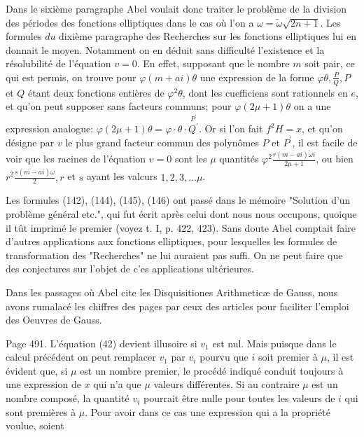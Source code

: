 \documentclass{article}
\begin{document}
Dans le sixième paragraphe Abel voulait donc traiter le problème de la division des périodes des fonctions elliptiques dans le cas où l'on a \(\omega=\tilde{\omega} \sqrt{2 n+1}\). Les formules \(d u\) dixième paragraphe des Recherches sur les fonctions elliptiques lui en donnait le moyen. Notamment on en déduit sans difficulté l'existence et la résolubilité de l'équation \(v=0\). En effet, supposant que le nombre \(m\) soit pair, ce qui est permis, on trouve pour \(\varphi(m+a i) \theta\) une expression de la forme \(\varphi \theta, \frac{P}{Q}, P\) et \(Q\) étant deux fonctions entières de \(\varphi^{2} \theta\), dont les cuefficiens sont rationnels en \(e\), et qu'on peut supposer sans facteurs communs; pour \(\varphi(2 \mu+1) \theta\) on a une expression analogue: \(\varphi(2 \mu+1) \theta=\varphi \cdot \theta \cdot \stackrel{P^{\prime}}{Q^{\prime}}\). Or si l'on fait \(f^{2} H=x\), et qu'on désigne par \(v\) le plus grand facteur commun des polynômes \(P\) et \(P^{\prime}\), il est facile de voir que les racines de l'équation \(v=0\) sont les \(\mu\) quantités \(\varphi^{2} \frac{r(m-a i) \tilde{\omega} i}{2 \mu+1}\), ou bien \(r^{2} \frac{s(m-a i) \omega}{2}, r\) et \(s\) ayant les valcurs \(1,2,3, \ldots \mu\).

Les formules (142), (144), (145), (146) ont passé dans le mémoire "Solution d'un problème général etc.", qui fut écrit après celui dont nous nous occupons, quoique il tût imprimé le premier (voyez t. I, p. 422, 423). Sans doute Abel comptait faire d'autres applications aux fonctions elliptiques, pour lesquelles les formules de transformation des "Recherches" ne lui auraient pas suffi. On ne peut faire que des conjectures sur l'objet de c'es applications ultérieures.

Dans les passages où Abel cite les Disquisitiones Arithmeticæ de Gauss, nous avons rumalacé les chiffres des pages par ceux des articles pour faciliter l'emploi des Oeuvres de Gauss.

Page 491. L'équation (42) devient illusoire si \(v_{1}\) est nul. Mais puisque dans le calcul précédent on peut remplacer \(v_{1}\) par \(v_{i}\) pourvu que \(i\) soit premier à \(\mu\), il est évident que, si \(\mu\) est un nombre premier, le procédé indiqué conduit toujours à une expression de \(x\) qui n'a que \(\mu\) valeurs différentes. Si au contraire \(\mu\) est un nombre composé, la quantité \(v_{i}\) pourrait être nulle pour toutes les valeurs de \(i\) qui sont premières à \(\mu\). Pour avoir dans ce cas une expression qui a la propriété voulue, soient
\end{document}
